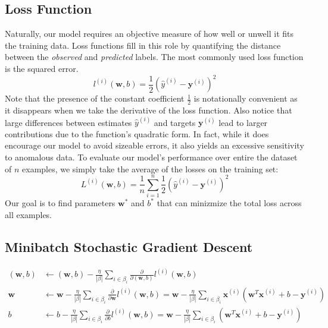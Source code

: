 \documentclass[a4paper,12pt]{article}
\theoremstyle{definition}
\begin{document}
    \subsection*{Loss Function}
    Naturally, our model requires an objective measure of how well or unwell it fits the training data.
    Loss functions fill in this role by quantifying the distance between the \textit{observed} and \textit{predicted}
    labels. The most commonly used loss function is the squared error.
    \begin{equation}
        l^{(i)}(\mathbf{w},b) = \frac{1}{2}(\hat{y}^{(i)}-\mathbf{y}^{(i)})^2
    \end{equation}
    Note that the presence of the constant coefficient $\frac{1}{2}$ is notationally convenient as it disappears when we
    take the derivative of the loss function. Also notice that large differences between estimates $\hat{y}^{(i)}$ 
    and targets $\mathbf{y}^{(i)}$ lead to larger contributions due to the function's quadratic form. In fact, while
    it does encourage our model to avoid sizeable errors, it also yields an excessive sensitivity to anomalous data.
    To evaluate our model's performance over entire the dataset of $n$ examples, we simply take the average of 
    the losses on the training set:
    \begin{equation}
        L^{(i)}(\mathbf{w},b) = \frac{1}{n}\sum_{i=1}^{n}\frac{1}{2}(\hat{y}^{(i)}-\mathbf{y}^{(i)})^2
    \end{equation}
    Our goal is to find parameters $\mathbf{w}^*$ and $b^*$ that can minizmize the total loss across all examples.

    \subsection*{Minibatch Stochastic Gradient Descent}
    \begin{equation*}
        \begin{aligned}
        (\mathbf{w},b) &\leftarrow (\mathbf{w},b) - \frac{\eta}{|\beta|}\sum_{i\in\beta_i}\frac{\partial}{\partial(\mathbf{w},b)}l^{(i)}(\mathbf{w},b) \\
        \mathbf{w}     &\leftarrow \mathbf{w} - \frac{\eta}{|\beta|}\sum_{i\in\beta_i}\frac{\partial}{\partial\mathbf{w}}l^{(i)}(\mathbf{w},b) = \mathbf{w}- \frac{\eta}{|\beta|}\sum_{i\in\beta_i}\mathbf{x}^{(i)}(\mathbf{w}^T\mathbf{x}^{(i)} + b - \mathbf{y}^{(i)}) \\
        b           &\leftarrow b - \frac{\eta}{|\beta|}\sum_{i\in\beta_i}\frac{\partial}{\partial b}l^{(i)}(\mathbf{w},b) = \mathbf{w}- \frac{\eta}{|\beta|}\sum_{i\in\beta_i}(\mathbf{w}^T\mathbf{x}^{(i)} + b - \mathbf{y}^{(i)})
        \end{aligned}
    \end{equation*}
\end{document}
